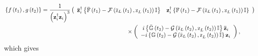 \documentclass[aps,preprint]{revtex4}%
\begin{document}
\begin{align}
&  \left\{  f\left(  t_{1}\right)  ,g\left(  t_{2}\right)  \right\}  =\frac
{1}{\left(  \mathbf{z}_{i}^{\dagger}\mathbf{z}_{i}\right)  ^{3}}\left(
\begin{array}
[c]{cc}%
\mathbf{\bar{z}}_{i}^{\dagger}\left\{  \mathbb{\bar{F}}\left(  t_{1}\right)
-\mathcal{F}\left(  \mathrm{\bar{z}}_{L}\left(  t_{1}\right)  \mathrm{,z}%
_{L}\left(  t_{1}\right)  \right)  \mathbb{I}\right\}  & \mathbf{z}%
_{i}^{\dagger}\left\{  \mathbb{F}\left(  t_{1}\right)  -\mathcal{F}\left(
\mathrm{\bar{z}}_{L}\left(  t_{1}\right)  \mathrm{,z}_{L}\left(  t_{1}\right)
\right)  \mathbb{I}\right\}
\end{array}
\right) \nonumber\\
&  \quad\qquad\qquad\qquad\qquad\qquad\qquad\qquad\qquad\qquad\qquad
\times\left(
\begin{array}
[c]{c}%
i\left\{  \mathbb{\bar{G}}\left(  t_{2}\right)  -\mathcal{G}\left(
\mathrm{\bar{z}}_{L}\left(  t_{2}\right)  \mathrm{,z}_{L}\left(  t_{2}\right)
\right)  \mathbb{I}\right\}  \mathbf{\bar{z}}_{i}\\
-i\left\{  \mathbb{G}\left(  t_{2}\right)  -\mathcal{G}\left(  \mathrm{\bar
{z}}_{L}\left(  t_{2}\right)  \mathrm{,z}_{L}\left(  t_{2}\right)  \right)
\mathbb{I}\right\}  \mathbf{z}_{i}%
\end{array}
\right)  ,
\end{align}
which gives
\end{document}
